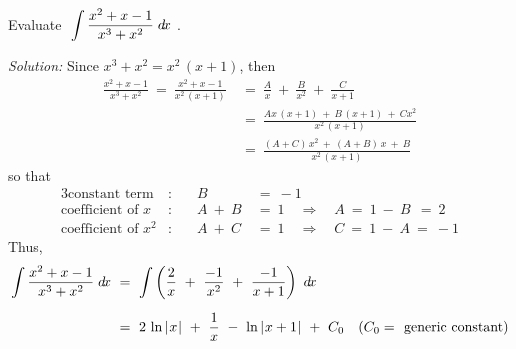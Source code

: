 \begin{exmp}\label{exmp:partfrac2}
\noindent Evaluate $~\displaystyle\int \frac{x^2 + x - 1}{x^3 + x^2}\;d\!x~$.\vspace{1mm}
\par\noindent\emph{Solution:} Since $x^3 + x^2 = x^2\,(x+1)$, then
\begin{align*}
\frac{x^2 + x - 1}{x^3 + x^2} ~=~ \frac{x^2 + x - 1}{x^2\,(x+1)} ~&=~ \frac{A}{x}
~+~ \frac{B}{x^2} ~+~ \frac{C}{x+1}\\[4pt]
&=~ \frac{Ax\,(x+1) ~+~ B\,(x+1) ~+~ Cx^2}{x^2\,(x+1)}\\[4pt]
&=~ \frac{(A+C)\,x^2 ~+~ (A+B)\,x ~+~ B}{x^2\,(x+1)}
\end{align*}
so that
\begin{alignat*}{3}
\text{constant term}&: &  B ~&=~ -1\\
\text{coefficient of $x$}&: \quad & A ~+~ B ~&=~ 1 \quad\Rightarrow\quad A ~=~ 1 ~-~ B ~~=~ 2\\
\text{coefficient of $x^2$}&: \quad & A ~+~ C ~&=~ 1 \quad\Rightarrow\quad C ~=~ 1 ~-~ A ~=~ -1
\end{alignat*}
Thus,
\begin{align*}
\int \frac{x^2 + x - 1}{x^3 + x^2}\;d\!x ~&=~ \int \left(\frac{2}{x} ~+~ \frac{-1}{x^2} ~+~
\frac{-1}{x+1} \right)~d\!x\\[6pt]
&=~ 2\,\ln\,\lvert\mspace{1mu}x\mspace{1mu}\rvert ~+~ \frac{1}{x} ~-~ \ln\,\lvert\mspace{1mu}x+1\mspace{1mu}\rvert ~+~ C_0 \quad\text{($C_0 =~$ generic constant)}
\end{align*}
\end{exmp}
\divider
\vspace{2mm}

